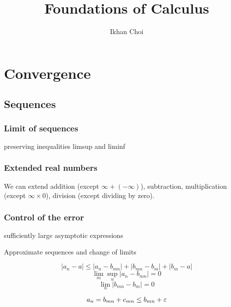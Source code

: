 \documentclass{../note}
\begin{document}
\title{Foundations of Calculus}
\author{Ikhan Choi}
\maketitle
\tableofcontents



\part{Convergence}
\chapter{Sequences}

\section{Limit of sequences}

preserving inequalities
limsup and liminf


\section{Extended real numbers}
\begin{prb}
We can extend addition (except $\infty+(-\infty)$), subtraction, multiplication (except $\infty\times0$), division (except dividing by zero).
\end{prb}

\begin{prb}
\end{prb}

\section{Control of the error}

sufficiently large
asymptotic expressions

Approximate sequences and change of limits

\begin{prb}
\[|a_n-a|\le|a_n-b_{mn}|+|b_{mn}-b_m|+|b_m-a|\]
\[\lim_m\sup_n|a_n-b_{mn}|=0\]
\[\lim_n|b_{mn}-b_m|=0\]
\end{prb}

\[a_n=b_{mn}+c_{mn}\le b_{mn}+\varepsilon\]
\end{document}
